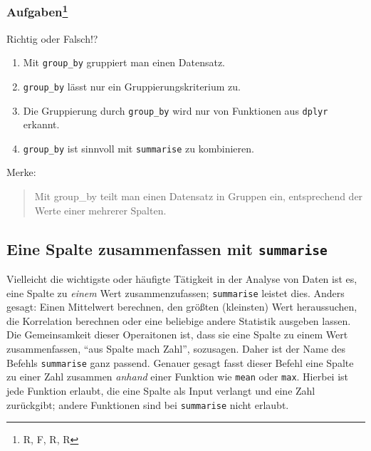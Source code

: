 \documentclass[12pt,ngerman,]{book}
\providecommand{\tightlist}{%
  \setlength{\itemsep}{0pt}\setlength{\parskip}{0pt}}
\let\rmarkdownfootnote\footnote%
\def\footnote{\protect\rmarkdownfootnote}
\let\BeginKnitrBlock\begin \let\EndKnitrBlock\end
\begin{document}
\subsubsection[Aufgaben]{\texorpdfstring{Aufgaben\footnote{R, F, R, R}}{Aufgaben}}\label{aufgaben-3}

\BeginKnitrBlock{rmdexercises}
Richtig oder Falsch!?

\begin{enumerate}
\def\labelenumi{\arabic{enumi}.}
\tightlist
\item
  Mit \texttt{group\_by} gruppiert man einen Datensatz.
\item
  \texttt{group\_by} lässt nur ein Gruppierungskriterium zu.
\item
  Die Gruppierung durch \texttt{group\_by} wird nur von Funktionen aus
  \texttt{dplyr} erkannt.
\item
  \texttt{group\_by} ist sinnvoll mit \texttt{summarise} zu kombinieren.
\end{enumerate}
\EndKnitrBlock{rmdexercises}

Merke:

\begin{quote}
Mit group\_by teilt man einen Datensatz in Gruppen ein, entsprechend der
Werte einer mehrerer Spalten.
\end{quote}

\subsection{\texorpdfstring{Eine Spalte zusammenfassen mit
\texttt{summarise}}{Eine Spalte zusammenfassen mit summarise}}\label{eine-spalte-zusammenfassen-mit-summarise}

Vielleicht die wichtigste oder häufigte Tätigkeit in der Analyse von
Daten ist es, eine Spalte zu \emph{einem} Wert zusammenzufassen;
\texttt{summarise} leistet dies. Anders gesagt:
Einen Mittelwert berechnen, den größten (kleinsten) Wert heraussuchen,
die Korrelation berechnen oder eine beliebige andere Statistik ausgeben
lassen. Die Gemeinsamkeit dieser Operaitonen ist, dass sie eine Spalte
zu einem Wert zusammenfassen, ``aus Spalte mach Zahl'', sozusagen. Daher
ist der Name des Befehls \texttt{summarise} ganz passend. Genauer gesagt
fasst dieser Befehl eine Spalte zu einer Zahl zusammen \emph{anhand}
einer Funktion wie \texttt{mean} oder \texttt{max}. Hierbei ist jede
Funktion erlaubt, die eine Spalte als Input verlangt und eine Zahl
zurückgibt; andere Funktionen sind bei \texttt{summarise} nicht erlaubt.
\end{document}
